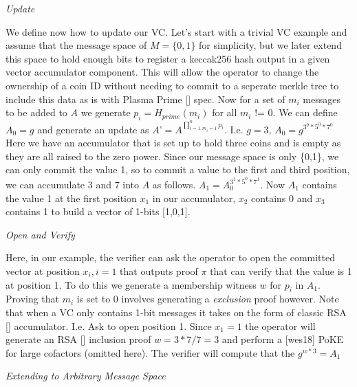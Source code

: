 \documentclass[11pt]{article}
\begin{document}
\centerline{\textit{Update}}

We define now how to update our VC. Let’s start with a trivial VC example and assume that the message space of $M = \{0,1\}$ for simplicity, but we later extend this space to hold enough bits to register a keccak256 hash output in a given vector accumulator component. This will allow the operator to change the ownership of a coin ID without needing to commit to a seperate merkle tree to include this data as is with Plasma Prime [] spec. Now for a set of $m_i$ messages to be added to $A$ we generate $p_i = H_{prime}(m_i)$ for all $m_i$ != 0. We can define $A_0=g$ and generate an update as $A’ = A^{\prod_{i=1, m_i=1}^{n}p_i}$. I.e. $g=3$, $A_0=g^{3^0*5^0*7^0}$ Here we have an accumulator that is set up to hold three coins and is empty as they are all raised to the zero power. Since our message space is only \{0,1\}, we can only commit the value 1, so to commit a value to the first and third position, we can accumulate 3 and 7 into $A$ as follows.  $A_1 = A_0^{3^1*5^0*7^1}$.  Now $A_1$ contains the value 1 at the first position $x_1$ in our accumulator, $x_2$ contains 0 and $x_3$ contains 1 to build a vector of 1-bits [1,0,1].
\\

\centerline{\textit{Open and Verify}}

Here, in our example, the verifier can ask the operator to open the committed vector at position $x_i, i=1$ that outputs proof $\pi$ that can verify that the value is 1 at position 1. To do this we generate a membership witness $w$ for $p_i$ in $A_1$. Proving that $m_i$ is set to 0 involves generating a \textit{exclusion} proof however. Note that when a VC only contains 1-bit messages it takes on the form of classic RSA [] accumulator. I.e. Ask to open position 1. Since $x_1 = 1$ the operator will generate an RSA [] inclusion proof $w= 3*7/7 = 3$ and perform a [wes18] PoKE for large cofactors (omitted here). The verifier will compute that the $g^{w*3} = A_1$ 
\\

\centerline{\textit{Extending to Arbitrary Message Space}}
\end{document}
